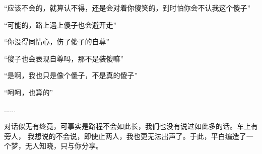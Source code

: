 \begin{adjustwidth}{0cm}{0cm}
{        “应该不会的，就算认不得，还是会对着你傻笑的，到时怕你会不认我这个傻子”

        “可能的，路上遇上傻子也会避开走”

        “你没得同情心，伤了傻子的自尊”

        “傻子也会表现自尊吗，那不是装傻嘛”

        “是啊，我也只是像个傻子，不是真的傻子”

        “呵呵，也算的”

        ...... 

        \hspace*{2em} 对话似无有终竟，可事实是路程不会如此长，我们也没有说过如此多的话。车上有旁人，
        我想说的不会说，即使止两人，我也更无法出声了。于此，平白编造了一个梦，无人知晓，只与你分享。
    }
\end{adjustwidth}
\newpage